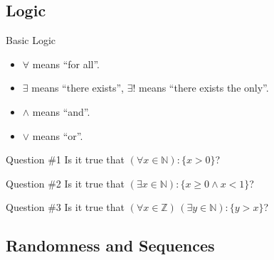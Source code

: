 \documentclass{beamer}
\begin{document}
    \subsection{Logic}
    \begin{frame}{Basic Logic}
        \begin{itemize}
          \item $\forall$ means ``for all''.
          \item $\exists$ means ``there exists'', $\exists!$ means ``there exists the only''.
          \item $\land$ means ``and''.
          \item $\lor$ means ``or''.\pause
        \end{itemize}

        \begin{alertblock}{Question \#1}
            Is it true that $(\forall x \in \mathbb{N}): \{x > 0\}$?\pause
        \end{alertblock}

        \begin{alertblock}{Question \#2}
            Is it true that $(\exists x \in \mathbb{N}): \{x \geq 0 \land x < 1\}$?\pause
        \end{alertblock}

        \begin{alertblock}{Question \#3}
            Is it true that $(\forall x \in \mathbb{Z})\, (\exists y \in \mathbb{N}): \{y > x\}$?
        \end{alertblock}
    \end{frame}

    \subsection{Randomness and Sequences}
\end{document}
